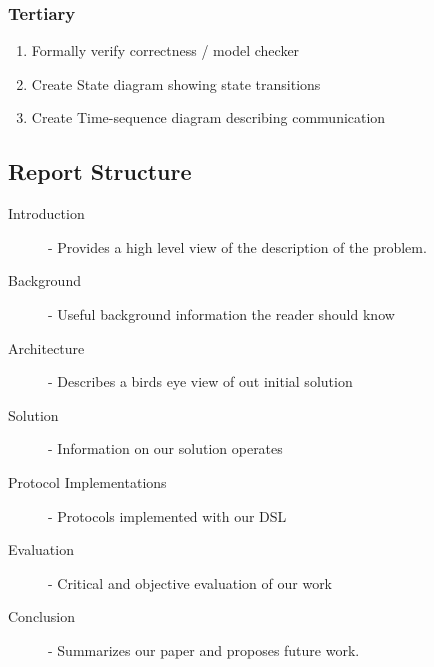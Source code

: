 \subsubsection{Tertiary}
\begin{enumerate}
    \item Formally verify correctness / model checker
    \item Create State diagram showing state transitions
    \item Create Time-sequence diagram describing communication
\end{enumerate}


\subsection{Report Structure}
\begin{description}
  \item[Introduction] - Provides a high level view of the description of the problem.
  \item[Background] - Useful background information the reader should know
  \item[Architecture] - Describes a birds eye view of out initial solution
  \item[Solution] - Information on our solution operates 
  \item[Protocol Implementations] - Protocols implemented with our DSL
  \item[Evaluation] - Critical and objective evaluation of our work 
  \item[Conclusion] - Summarizes our paper and proposes future work.
\end{description}








